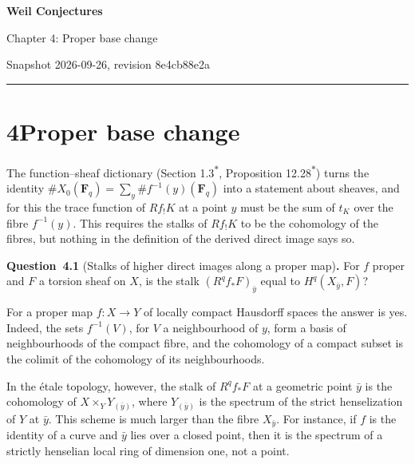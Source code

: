 \documentclass[11pt]{article}
\newenvironment{bpstatement}[2]{\par\addvspace{0.6\baselineskip}\noindent\textbf{#1}#2\textbf{.}\enspace\ignorespaces}
  {\par\addvspace{0.4\baselineskip}}
\newcommand{\bpout}[1]{#1\textsuperscript{\hyperlink{bp-outside}{\ensuremath{\ast}}}}
\begin{document}
\pagestyle{plain}
\begin{center}
{\LARGE\bfseries Weil Conjectures\par}
\vspace{0.7em}
{\large Chapter 4: Proper base change\par}
\vspace{0.5em}
{\small\color{bpmuted}Snapshot 2026-09-26, revision 8e4cb88e2a\par}
\end{center}
\vspace{0.5em}
{\small\tableofcontents}
\bigskip\hrule\bigskip

\section*{\texorpdfstring{4\quad Proper base change}{4 Proper base change}}
\label{bp1}%
\label{bp2}%
The function–sheaf dictionary (Section \bpout{1.3}, Proposition \bpout{12.28}) turns the identity \(\#X_0(\mathbf F_q)=\sum_y\#f^{-1}(y)(\mathbf F_q)\) into a statement about sheaves, and for this the trace function of \(Rf_!K\) at a point \(y\) must be the sum of \(t_K\) over the fibre \(f^{-1}(y)\). This requires the stalks of \(Rf_!K\) to be the cohomology of the fibres, but nothing in the definition of the derived direct image says so.

\label{bp3}%
\begin{bpstatement}{Question~4.1}{ (Stalks of higher direct images along a proper map)}
For \(f\) proper and \(F\) a torsion sheaf on \(X\), is the stalk \((R^qf_*F)_{\bar y}\) equal to \(H^q(X_{\bar y},F)\)?
\end{bpstatement}

\label{bp4}%
For a proper map \(f:X\to Y\) of locally compact Hausdorff spaces the answer is yes. Indeed, the sets \(f^{-1}(V)\), for \(V\) a neighbourhood of \(y\), form a basis of neighbourhoods of the compact fibre, and the cohomology of a compact subset is the colimit of the cohomology of its neighbourhoods.

In the étale topology, however, the stalk of \(R^qf_*F\) at a geometric point \(\bar y\) is the cohomology of \(X\times_YY_{(\bar y)}\), where \(Y_{(\bar y)}\) is the spectrum of the strict henselization of \(Y\) at \(\bar y\). This scheme is much larger than the fibre \(X_{\bar y}\). For instance, if \(f\) is the identity of a curve and \(\bar y\) lies over a closed point, then it is the spectrum of a strictly henselian local ring of dimension one, not a point.
\end{document}
